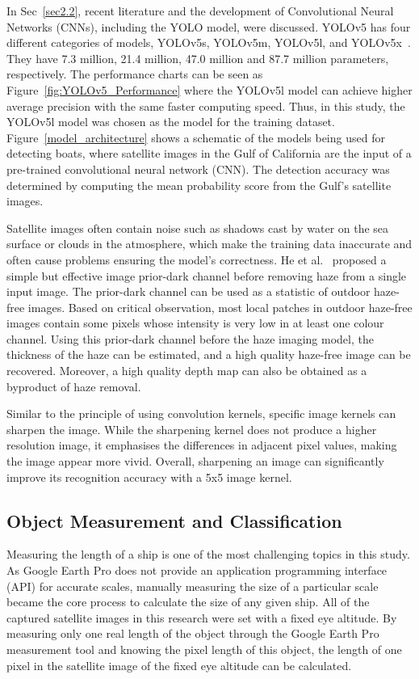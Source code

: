 In Sec~\ref{sec2.2}, recent literature and the development of Convolutional Neural Networks (CNNs), including the YOLO model, were discussed. YOLOv5 has four different categories of models, YOLOv5s, YOLOv5m, YOLOv5l, and YOLOv5x~\cite{glenn_jocher_2022_6222936}. They have 7.3 million, 21.4 million, 47.0 million and 87.7 million parameters, respectively. The performance charts can be seen as Figure~\ref{fig:YOLOv5_Performance} where the YOLOv5l model can achieve higher average precision with the same faster computing speed. Thus, in this study, the YOLOv5l model was chosen as the model for the training dataset. Figure~\ref{model_architecture} shows a schematic of the models being used for detecting boats, where satellite images in the Gulf of California are the input of a pre-trained convolutional neural network (CNN). The detection accuracy was determined by computing the mean probability score from the Gulf's satellite images.

Satellite images often contain noise such as shadows cast by water on the sea surface or clouds in the atmosphere, which make the training data inaccurate and often cause problems ensuring the model's correctness. He et al.~\cite{He2009SingleIH} proposed a simple but effective image prior-dark channel before removing haze from a single input image. The prior-dark channel can be used as a statistic of outdoor haze-free images. Based on critical observation, most local patches in outdoor haze-free images contain some pixels whose intensity is very low in at least one colour channel. Using this prior-dark channel before the haze imaging model, the thickness of the haze can be estimated, and a high quality haze-free image can be recovered. Moreover, a high quality depth map can also be obtained as a byproduct of haze removal.

Similar to the principle of using convolution kernels, specific image kernels can sharpen the image. While the sharpening kernel does not produce a higher resolution image, it emphasises the differences in adjacent pixel values, making the image appear more vivid. Overall, sharpening an image can significantly improve its recognition accuracy with a 5x5 image kernel.

\subsection{Object Measurement and Classification}
Measuring the length of a ship is one of the most challenging topics in this study. As Google Earth Pro does not provide an application programming interface (API) for accurate scales, manually measuring the size of a particular scale became the core process to calculate the size of any given ship. All of the captured satellite images in this research were set with a fixed eye altitude. By measuring only one real length of the object through the Google Earth Pro measurement tool and knowing the pixel length of this object, the length of one pixel in the satellite image of the fixed eye altitude can be calculated.

